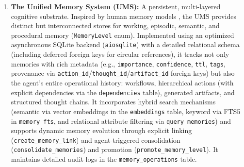 \documentclass[12pt,a4paper]{article}
\newcommand{\code}[1]{\nolinkurl{#1}}
\begin{document}
\begin{enumerate}
    \item \textbf{The Unified Memory System (UMS):} A persistent, multi-layered cognitive substrate. Inspired by human memory models \cite{Ref3, Ref19}, the UMS provides distinct but interconnected stores for working, episodic, semantic, and procedural memory (\code{MemoryLevel} enum). Implemented using an optimized asynchronous SQLite backend (\code{aiosqlite}) with a detailed relational schema (including deferred foreign keys for circular references), it tracks not only memories with rich metadata (e.g., \code{importance}, \code{confidence}, \code{ttl}, \code{tags}, provenance via \code{action\_id}/\code{thought\_id}/\code{artifact\_id} foreign keys) but also the agent's entire operational history: workflows, hierarchical actions (with explicit dependencies via the \code{dependencies} table), generated artifacts, and structured thought chains. It incorporates hybrid search mechanisms (semantic via vector embeddings in the \code{embeddings} table, keyword via FTS5 in \code{memory\_fts}, and relational attribute filtering via \code{query\_memories}) and supports dynamic memory evolution through explicit linking (\code{create\_memory\_link}) and agent-triggered consolidation (\code{consolidate\_memories}) and promotion (\code{promote\_memory\_level}). It maintains detailed audit logs in the \code{memory\_operations} table.


\end{enumerate}
\end{document}
